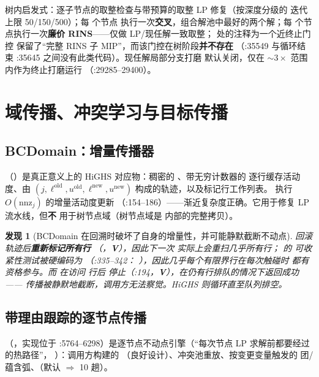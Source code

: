 \documentclass[11pt]{ctexart}
\newtheorem{finding}{发现}
\newcommand{\nnz}{\mathrm{nnz}}
\begin{document}
树内启发式：逐子节点的取整检查与带预算的取整 LP 修复（按深度分级的
迭代上限 50/150/500）；每  个节点
执行一次\textbf{交叉}，组合解池中最好的两个解；每
 个节点执行一次\textbf{廉价 RINS}——仅做
LP/现任解一致取整； 处的注释为一个近终止门控
保留了“完整 RINS 子 MIP”，而该门控在树阶段\textbf{并不存在}
（:35549 与循环结束 :35645 之间没有此类代码）。现任解局部分支打磨
默认关闭，仅在 $\sim 3\times$ 范围内作为终止打磨运行
（:29285--29400）。

\section{域传播、冲突学习与目标传播}

\subsection{BCDomain：增量传播器}
（）是真正意义上的 HiGHS
 对应物：稠密的 、带无穷计数器的
逐行缓存活动度、由 $(j, \ell^{\mathrm{old}}, u^{\mathrm{old}},
\ell^{\mathrm{new}}, u^{\mathrm{new}})$ 构成的轨迹，以及标记行工作列表。
 执行 $O(\nnz_j)$ 的增量活动度更新
（:154--186）——渐近复杂度正确。它用于修复 LP 流水线，但\textbf{不}
用于树节点域（树节点域是  内部的完整拷贝）。

\begin{finding}[BCDomain 在回溯时破坏了自身的增量性，并可能静默截断不动点]
 回滚轨迹后\textbf{重新标记所有行}
（，\textbf{V}），因此下一次
 实际上会重扫几乎所有行； 的
可收紧性测试被硬编码为 （:335--342：
），因此几乎每个有限界行在每次触碰时
都有资格参与。而  在访问  行后
停止（:194，\textbf{V}），\emph{在仍有行排队的情况下返回成功}——
传播被静默地截断，调用方无法察觉。HiGHS 则循环直至队列排空。
\end{finding}

\subsection{带理由跟踪的逐节点传播}
（，实现位于
:5764--6298）是逐节点不动点引擎（“每次节点 LP 求解前都要经过的热路径”，
）：调用方构建的
（良好设计）、冲突池重放、按变更变量触发的
团/蕴含弧、（默认
 $\Rightarrow$ 10 趟）。
\end{document}
